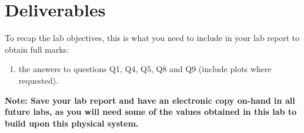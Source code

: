 
\section{Deliverables}
To recap the lab objectives, this is what you need to include in your lab report to obtain full marks:
\begin{enumerate}
    \item the answers to questions Q1, Q4, Q5, Q8 and Q9 (include plots where requested).
\end{enumerate}
\textbf{Note: Save your lab report and have an electronic copy on-hand in all future labs, as you will need some of the values obtained in this lab to build upon this physical system.}